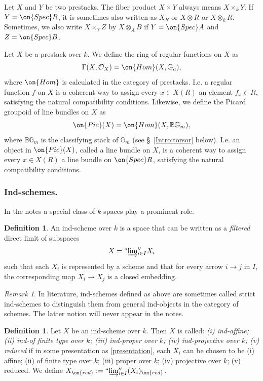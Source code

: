 \documentclass[]{pcmi}
\theoremstyle{plain}
\theoremstyle{remark}
\newtheorem{rmk}[equation]{Remark}
\theoremstyle{definition}
\newtheorem{dfn}[equation]{Definition}
\newcommand{\bB}{{\mathbb B}}
\newcommand{\bG}{{\mathbb G}}
\newcommand{\mO}{{\mathcal O}}
\newcommand{\Hom}{{\on{Hom}}}
\newcommand{\Pic}{{\on{Pic}}}
\newcommand{\Spec}{\on{Spec}}
\begin{document}
Let $X$ and $Y$ be two prestacks. The fiber product $X\times Y$ always means $X\times_kY$. If $Y=\Spec R$, it is sometimes also written as $X_R$ or $X\otimes R$ or $X\otimes_k R$. Sometimes, we also write $X\times_YZ$ by $X\otimes_AB$ if $Y=\Spec A$ and $Z=\Spec B$.

Let $X$ be a prestack over $k$. We define the ring of regular functions on $X$ as
\begin{equation}\label{reg fun}
\Gamma(X,\mO_X)=\Hom(X, \bG_a),
\end{equation}
where $\Hom$ is calculated in the category of prestacks. I.e. a regular function $f$ on $X$ is a coherent way to assign every $x\in X(R)$ an element $f_x\in R$, satisfying the natural compatibility conditions.
Likewise, we define the Picard groupoid of line bundles on $X$ as
\begin{equation}\label{Pic line}
\Pic(X)=\Hom(X,\bB\bG_m),
\end{equation}
where $\bB\bG_m$ is the classifying stack of $\bG_m$ (see \S~\ref{Intro:torsor} below).
I.e. an object in $\Pic(X)$, called a line bundle on $X$, is a coherent way to assign every $x\in X(R)$ a line bundle on $\Spec R$, satisfying the natural compatibility conditions.


\subsubsection{Ind-schemes.}\label{Intro:Indsch}
In the notes a special class of $k$-spaces play a prominent role.

\begin{dfn}\label{ind-sch}
An ind-scheme over $k$ is a space that can be written as a \emph{filtered} direct limit of subspaces 
\begin{equation}\label{presentation}
X=``\underrightarrow{\lim}''_{i\in I}X_i
\end{equation}
such that each $X_i$ is represented by a scheme and that for every arrow
 $i\to j$ in $I$, the corresponding map $X_i\to X_j$ is a closed embedding.
\end{dfn}

\begin{rmk}In literature, ind-schemes defined as above are sometimes called strict ind-schemes to distinguish them from general ind-objects in the category of schemes. The latter notion will never appear in the notes.
\end{rmk}



\begin{dfn}Let $X$ be an ind-scheme over $k$. Then $X$ is called: \emph{(i) ind-affine;  (ii) ind-of finite type over $k$; (iii) ind-proper over $k$; (iv) ind-projective over $k$; (v) reduced}
if in some presentation as \eqref{presentation},
each $X_i$ can be chosen to be (i) affine; (ii) of finite type over $k$; 
(iii) proper over $k$; (iv) projective over $k$; (v) reduced. We define $X_{\on{red}}:=``\underrightarrow{\lim}''_{i\in
I}(X_i)_{\on{red}}$. 
\end{dfn}
\end{document}
